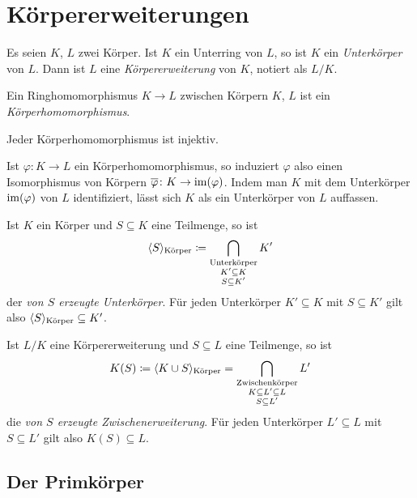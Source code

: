 \chapter{Körpererweiterungen}

\begin{definition}
  Es seien $K$, $L$ zwei Körper.
  Ist $K$ ein Unterring von $L$, so ist $K$ ein \emph{Unterkörper} von $L$.
  Dann ist $L$ eine \emph{Körpererweiterung} von $K$, notiert als $L/K$.
\end{definition}

\begin{definition}
  Ein Ringhomomorphismus $K \to L$ zwischen Körpern $K$, $L$ ist ein \emph{Körperhomomorphismus}.
\end{definition}

\begin{lemma}
  Jeder Körperhomomorphismus ist injektiv.
\end{lemma}

Ist $\varphi \colon K \to L$ ein Körperhomomorphismus, so induziert $\varphi$ also einen Isomorphismus von Körpern $\overline{\varphi} \colon  K \to \operatorname{im}(\varphi)$.
Indem man $K$ mit dem Unterkörper $\operatorname{im}(\varphi)$ von $L$ identifiziert, lässt sich $K$ als ein Unterkörper von $L$ auffassen.

\begin{definition}
  Ist $K$ ein Körper und $S \subseteq K$ eine Teilmenge, so ist
  \[
              \langle S\rangle_{\text{Körper}}
    \coloneqq  \bigcap_{\substack{\text{Unterkörper} \\ K' \subseteq K \\S \subseteq K'}} K'
  \]
  der \emph{von $S$ erzeugte Unterkörper}.
  Für jeden Unterkörper $K' \subseteq K$ mit $S \subseteq K'$ gilt also $\langle S\rangle_{\text{Körper}} \subseteq K'$.

  Ist $L/K$ eine Körpererweiterung und $S \subseteq L$ eine Teilmenge, so ist
  \[
              K(S)
    \coloneqq  \langle K \cup S\rangle_{\text{Körper}}
    =         \bigcap_{\substack{\text{Zwischenkörper} \\ K \subseteq L' \subseteq L \\ S \subseteq L'}} L'
  \]
  die \emph{von $S$ erzeugte Zwischenerweiterung}.
  Für jeden Unterkörper $L' \subseteq L$ mit $S \subseteq L'$ gilt also $K(S) \subseteq L$.
\end{definition}





\section{Der Primkörper}

